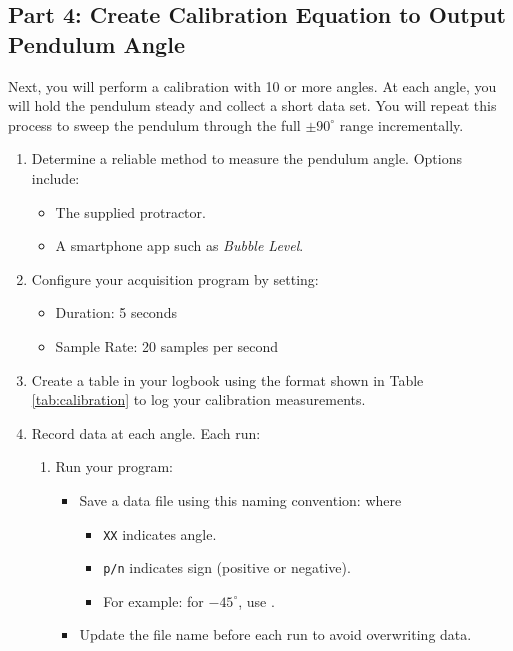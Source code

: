 \documentclass{article}
\begin{document}
\subsection{Part 4: Create Calibration Equation to Output Pendulum Angle}
Next, you will perform a calibration with 10 or more angles. At each angle, you will hold the pendulum steady and collect a short data set. You will repeat this process to sweep the pendulum through the full $\pm 90^\circ$ range incrementally.  

\begin{enumerate}
    \item Determine a reliable method to measure the pendulum angle. Options include:
    \begin{itemize}
        \item The supplied protractor.
        \item A smartphone app such as \textit{Bubble Level}.
    \end{itemize}

    \item Configure your acquisition program by setting:
    \begin{itemize}
        \item Duration: 5 seconds
        \item Sample Rate: 20 samples per second
    \end{itemize}
    \item Create a table in your logbook using the format shown in Table \ref{tab:calibration} to log your calibration measurements.  
    \item Record data at each angle. Each run:
    \begin{enumerate}[label=\alph*.]
        \item Run your program:
        \begin{itemize}
            \item Save a data file using this naming convention:  where
            \begin{itemize}
                \item \texttt{XX} indicates angle.
                \item \texttt{p/n} indicates sign (positive or negative).
                \item For example: for $-45^\circ$, use .
            \end{itemize}
            \item Update the file name before each run to avoid overwriting data.
        \end{itemize}


\end{enumerate}
\end{enumerate}
\end{document}
